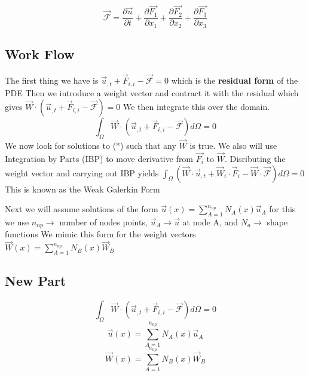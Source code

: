 \documentclass{article}
\begin{document}
\begin{equation}
\vec{\mathscr{F}}=\frac{\partial \vec{u}}{\partial t}+\frac{\partial \vec{F_1}}{\partial x_1}+\frac{\partial \vec{F_2}}{\partial x_2}+\frac{\partial \vec{F_3}}{\partial x_3
}
\end{equation}


\newpage
\subsection{Work Flow}%
The first thing we have is $\vec{u}_{,t}+\vec{F}_{i,i}-\vec{\mathscr{F}}=0$ which is the \textbf{residual form} of the PDE
\newline
Then we introduce a weight vector and contract it with the residual which gives $\vec{W} \cdot (\vec{u}_{,t}+\vec{F}_{i,i}-\vec{\mathscr{F}})=0$
\vskip 0.05in \noindent We then integrate this over the domain.
\begin{equation} \tag{*}
\int_\Omega \vec{W} \cdot (\vec{u}_{,t}+\vec{F}_{i,i}-\vec{\mathscr{F}})d\Omega =0
\end{equation}
\newline
We now look for solutions to (*) such that any $\vec{W}$ is true. We also will use Integration by Parts (IBP) to move derivative from $\vec{F_i}$ to $\vec{W}$. Disributing the weight vector and carrying out IBP yields
\vskip 0.06in
$\int_\Omega (\vec{W} \cdot \vec{u}_{,t}+\vec{W}_i\cdot \vec{F}_i-\vec{W}\cdot \vec{\mathscr{F}})d\Omega =0$
\vskip 0.06in
\noindent This is known as the Weak Galerkin Form

\noindent
Next we will assume solutions of the form \indent $\vec{u}(x)=\sum_{A=1}^{n_{np}}N_A(x)\vec{u}_A$
 for this we use $n_{np} \rightarrow $ number of nodes points, $\vec{u}_A \rightarrow \vec{u}$ at node A, and $N_a \rightarrow$ shape functions
\newline \noindent
We mimic this form for the weight vectors $\vec{W}(x)=\sum_{A=1}^{n_{np}}N_B(x)\vec{W}_B$


\subsection{New Part}%
\begin{equation}
\int_\Omega \vec{W} \cdot (\vec{u}_{,t}+\vec{F}_{i,i}-\vec{\mathscr{F}})d\Omega =0
\end{equation}
\begin{equation}
\vec{u}(x)=\sum_{A=1}^{n_{np}}N_A(x)\vec{u}_A
\end{equation}
\begin{equation}
\vec{W}(x)=\sum_{A=1}^{n_{np}}N_B(x)\vec{W}_B
\end{equation}
\end{document}
